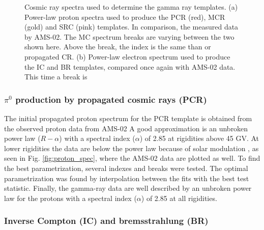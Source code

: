 \begin{figure}[h]
\begin{minipage}[h]{0.45\textwidth}
	  \subcaption{}
	  \label{fig:electron_spec}
  \end{minipage}
  \caption{Cosmic ray spectra used to determine the gamma ray templates. (a) Power-law proton spectra used to produce the PCR (red), MCR (gold) and SRC (pink) templates. In comparison, the measured data by AMS-02. The MC spectrum breaks are varying between the two shown here. Above the break, the index is the same than or propagated CR. (b) Power-law electron spectrum used to produce the IC and BR templates, compared once again with AMS-02 data. This time a break is }
  \label{fig:cosmic_ray_spec}
\end{figure}


\subsubsection{$\pi^0$ production by propagated cosmic rays (PCR)}

The initial propagated proton spectrum for the PCR template is obtained from the observed proton data from AMS-02 %
A good approximation is an unbroken power law ($R-\alpha$) with a spectral index ($\alpha$) of 2.85 at rigidities above 45 GV. At lower rigidities the data are below the power law because of solar modulation %
, as seen in Fig. \ref{fig:proton_spec}, where the AMS-02 data are plotted as well. To find the best parametrization, several indexes and breaks were tested. The optimal parametrization was found by interpolation between the fits with the best test statistic.
Finally, the gamma-ray data are well described by an unbroken power law for the protons with a spectral index ($\alpha$) of 2.85 at all rigidities.\\



\subsubsection{Inverse Compton (IC) and bremsstrahlung (BR)}

